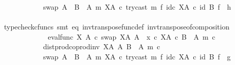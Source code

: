 \begin{isabellebody}
\ \ \ \ \ \ \ \ \ \ \ \ swap\ {\isacharparenleft}{\kern0pt}A\ {\isasymCoprod}\ {\isacharparenleft}{\kern0pt}B\ {\isasymsetminus}\ {\isacharparenleft}{\kern0pt}A{\isacharcomma}{\kern0pt}\ m{\isacharparenright}{\kern0pt}{\isacharparenright}{\kern0pt}{\isacharparenright}{\kern0pt}\ {\isacharparenleft}{\kern0pt}X\isactrlbsup A\isactrlesup {\isacharparenright}{\kern0pt}\ {\isasymcirc}\isactrlsub c\ try{\isacharunderscore}{\kern0pt}cast\ m\ {\isasymtimes}\isactrlsub f\ id\isactrlsub c\ {\isacharparenleft}{\kern0pt}X\isactrlbsup A\isactrlesup {\isacharparenright}{\kern0pt}{\isacharparenright}{\kern0pt}\isactrlsup {\isasymsharp}{\isacharparenright}{\kern0pt}{\isacharparenright}{\kern0pt}{\isacharparenright}{\kern0pt}\ {\isasymcirc}\isactrlsub c\ {\isacharparenleft}{\kern0pt}id\ B\ {\isasymtimes}\isactrlsub f\ \ h{\isacharparenright}{\kern0pt}{\isachardoublequoteclose}\isanewline
\ \ \ \ \ \ \ \ \ \ \ \ \isamarkupfalse%
\ {\isacharparenleft}{\kern0pt}typecheck{\isacharunderscore}{\kern0pt}cfuncs{\isacharcomma}{\kern0pt}\ smt\ eq\ inv{\isacharunderscore}{\kern0pt}transpose{\isacharunderscore}{\kern0pt}func{\isacharunderscore}{\kern0pt}def{}\ inv{\isacharunderscore}{\kern0pt}transpose{\isacharunderscore}{\kern0pt}of{\isacharunderscore}{\kern0pt}composition{\isacharparenright}{\kern0pt}\isanewline
\ \ \ \ \ \ \ \ \ \ \isamarkupfalse%
\ \isamarkupfalse%
\ {\isachardoublequoteopen}{\isacharparenleft}{\kern0pt}{\isacharparenleft}{\kern0pt}eval{\isacharunderscore}{\kern0pt}func\ X\ A\ {\isasymcirc}\isactrlsub c\ swap\ {\isacharparenleft}{\kern0pt}X\isactrlbsup A\isactrlesup {\isacharparenright}{\kern0pt}\ A{\isacharparenright}{\kern0pt}\ {\isasymamalg}\ {\isacharparenleft}{\kern0pt}x\ {\isasymcirc}\isactrlsub c\ {\isasymbeta}\isactrlbsub X\isactrlbsup A\isactrlesup \ {\isasymtimes}\isactrlsub c\ {\isacharparenleft}{\kern0pt}B\ {\isasymsetminus}\ {\isacharparenleft}{\kern0pt}A{\isacharcomma}{\kern0pt}\ m{\isacharparenright}{\kern0pt}{\isacharparenright}{\kern0pt}\isactrlesub {\isacharparenright}{\kern0pt}\ {\isasymcirc}\isactrlsub c\isanewline
\ \ \ \ \ \ \ \ \ \ \ \ dist{\isacharunderscore}{\kern0pt}prod{\isacharunderscore}{\kern0pt}coprod{\isacharunderscore}{\kern0pt}inv\ {\isacharparenleft}{\kern0pt}X\isactrlbsup A\isactrlesup {\isacharparenright}{\kern0pt}\ A\ {\isacharparenleft}{\kern0pt}B\ {\isasymsetminus}\ {\isacharparenleft}{\kern0pt}A{\isacharcomma}{\kern0pt}\ m{\isacharparenright}{\kern0pt}{\isacharparenright}{\kern0pt}\ {\isasymcirc}\isactrlsub c\isanewline
\ \ \ \ \ \ \ \ \ \ \ \ swap\ {\isacharparenleft}{\kern0pt}A\ {\isasymCoprod}\ {\isacharparenleft}{\kern0pt}B\ {\isasymsetminus}\ {\isacharparenleft}{\kern0pt}A{\isacharcomma}{\kern0pt}\ m{\isacharparenright}{\kern0pt}{\isacharparenright}{\kern0pt}{\isacharparenright}{\kern0pt}\ {\isacharparenleft}{\kern0pt}X\isactrlbsup A\isactrlesup {\isacharparenright}{\kern0pt}\ {\isasymcirc}\isactrlsub c\ try{\isacharunderscore}{\kern0pt}cast\ m\ {\isasymtimes}\isactrlsub f\ id\isactrlsub c\ {\isacharparenleft}{\kern0pt}X\isactrlbsup A\isactrlesup {\isacharparenright}{\kern0pt}{\isacharparenright}{\kern0pt}\ {\isasymcirc}\isactrlsub c\ {\isacharparenleft}{\kern0pt}id\ B\ {\isasymtimes}\isactrlsub f\ \ g{\isacharparenright}{\kern0pt}\isanewline

\end{isabellebody}
